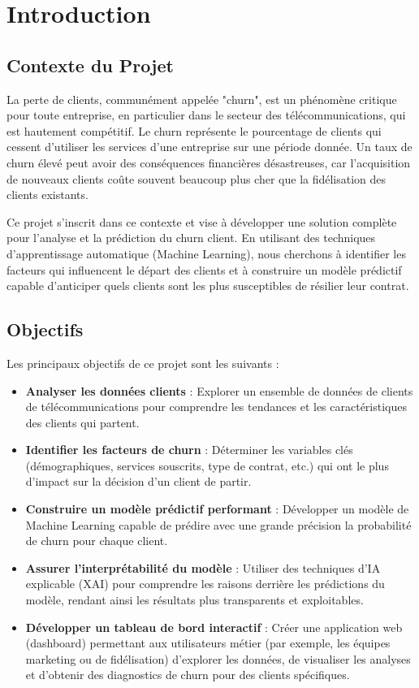 \chapter{Introduction}
\minitoc

\section{Contexte du Projet}
La perte de clients, communément appelée "churn", est un phénomène critique pour toute entreprise, en particulier dans le secteur des télécommunications, qui est hautement compétitif. Le churn représente le pourcentage de clients qui cessent d'utiliser les services d'une entreprise sur une période donnée. Un taux de churn élevé peut avoir des conséquences financières désastreuses, car l'acquisition de nouveaux clients coûte souvent beaucoup plus cher que la fidélisation des clients existants.

Ce projet s'inscrit dans ce contexte et vise à développer une solution complète pour l'analyse et la prédiction du churn client. En utilisant des techniques d'apprentissage automatique (Machine Learning), nous cherchons à identifier les facteurs qui influencent le départ des clients et à construire un modèle prédictif capable d'anticiper quels clients sont les plus susceptibles de résilier leur contrat.

\section{Objectifs}
Les principaux objectifs de ce projet sont les suivants :
\begin{itemize}[label=\textcolor{maincolor}{\textbullet}]
    \item \textbf{Analyser les données clients} : Explorer un ensemble de données de clients de télécommunications pour comprendre les tendances et les caractéristiques des clients qui partent.
    \item \textbf{Identifier les facteurs de churn} : Déterminer les variables clés (démographiques, services souscrits, type de contrat, etc.) qui ont le plus d'impact sur la décision d'un client de partir.
    \item \textbf{Construire un modèle prédictif performant} : Développer un modèle de Machine Learning capable de prédire avec une grande précision la probabilité de churn pour chaque client.
    \item \textbf{Assurer l'interprétabilité du modèle} : Utiliser des techniques d'IA explicable (XAI) pour comprendre les raisons derrière les prédictions du modèle, rendant ainsi les résultats plus transparents et exploitables.
    \item \textbf{Développer un tableau de bord interactif} : Créer une application web (dashboard) permettant aux utilisateurs métier (par exemple, les équipes marketing ou de fidélisation) d'explorer les données, de visualiser les analyses et d'obtenir des diagnostics de churn pour des clients spécifiques.
\end{itemize}


